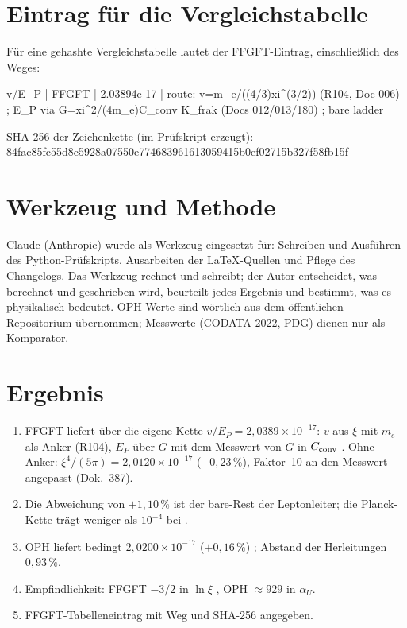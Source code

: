 \section{Eintrag für die Vergleichstabelle}

Für eine gehashte Vergleichstabelle lautet der FFGFT-Eintrag, einschließlich
des Weges:

\begin{center}
\begin{minipage}{0.92\textwidth}
\small\ttfamily
v/E\_P | FFGFT | 2.03894e-17 | route: v=m\_e/((4/3)xi\^{}(3/2)) (R104, Doc 006) ; E\_P via G=xi\^{}2/(4m\_e)C\_conv K\_frak (Docs 012/013/180) ; bare ladder
\end{minipage}
\end{center}

\noindent SHA-256 der Zeichenkette (im Prüfskript erzeugt):\\
{\small\ttfamily 84fac85fc55d8c5928a07550e774683961613059415b0ef02715b327f58fb15f}

\section*{Werkzeug und Methode}
Claude (Anthropic) wurde als Werkzeug eingesetzt für: Schreiben und Ausführen
des Python-Prüfskripts, Ausarbeiten der \LaTeX-Quellen und Pflege des
Changelogs. Das Werkzeug rechnet und schreibt; der Autor entscheidet, was
berechnet und geschrieben wird, beurteilt jedes Ergebnis und bestimmt, was es
physikalisch bedeutet. OPH-Werte sind wörtlich aus dem öffentlichen
Repositorium übernommen; Messwerte (CODATA 2022, PDG) dienen nur als
Komparator.

\section{Ergebnis}

\begin{enumerate}
\item FFGFT liefert über die eigene Kette $v/E_P=2{,}0389\times10^{-17}$: $v$ aus
  $\xi$ mit $m_e$ als Anker (R104), $E_P$ über $G$ mit dem Messwert von $G$
  in $C_{\rm conv}$ \KM. Ohne Anker: $\xi^4/(5\pi)=2{,}0120\times10^{-17}$
  ($-0{,}23\,\%$), Faktor~10 an den Messwert angepasst (Dok.~387).
\item Die Abweichung von $+1{,}10\,\%$ ist der bare-Rest der Leptonleiter;
  die Planck-Kette trägt weniger als $10^{-4}$ bei \KM.
\item OPH liefert bedingt $2{,}0200\times10^{-17}$ ($+0{,}16\,\%$) \QM; Abstand
  der Herleitungen $0{,}93\,\%$.
\item Empfindlichkeit: FFGFT $-3/2$ in $\ln\xi$ \BM, OPH $\approx929$ in $\alpha_U$.
\item FFGFT-Tabelleneintrag mit Weg und SHA-256 angegeben.
\end{enumerate}

